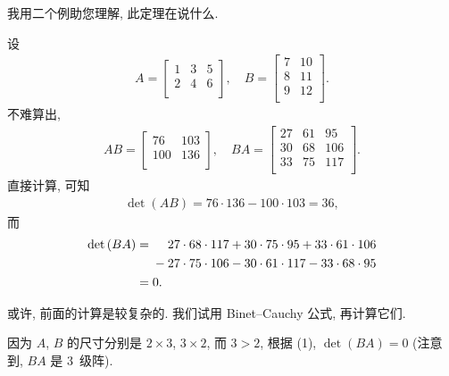 我用二个例助您理解, 此定理在说什么.

\begin{example}
    设
    \begin{align*}
        A =
        \begin{bmatrix}
            1 & 3 & 5 \\
            2 & 4 & 6 \\
        \end{bmatrix},
        \quad
        B =
        \begin{bmatrix}
            7 & 10 \\
            8 & 11 \\
            9 & 12 \\
        \end{bmatrix}.
    \end{align*}
    不难算出,
    \begin{align*}
        AB =
        \begin{bmatrix}
            76  & 103 \\
            100 & 136 \\
        \end{bmatrix},
        \quad
        BA =
        \begin{bmatrix}
            27 & 61 & 95  \\
            30 & 68 & 106 \\
            33 & 75 & 117 \\
        \end{bmatrix}.
    \end{align*}
    直接计算, 可知
    \begin{align*}
        \det {(AB)} = 76 \cdot 136 - 100 \cdot 103 = 36,
    \end{align*}
    而
    \begin{align*}
        \det {(BA)}
        = {} & \hphantom{{} + {}}
        27 \cdot 68 \cdot 117
        + 30 \cdot 75 \cdot 95
        + 33 \cdot 61 \cdot 106
        \\
             &
        - 27 \cdot 75 \cdot 106
        - 30 \cdot 61 \cdot 117
        - 33 \cdot 68 \cdot 95
        \\
        = {} & 0.
    \end{align*}

    或许, 前面的计算是较复杂的.
    我们试用 Binet--Cauchy 公式, 再计算它们.

    因为 \(A\), \(B\) 的尺寸分别是 \(2 \times 3\), \(3 \times 2\),
    而 \(3 > 2\),
    根据 (1), \(\det {(BA)} = 0\)
    (注意到, \(BA\) 是 \(3\)~级阵).


\end{example}
